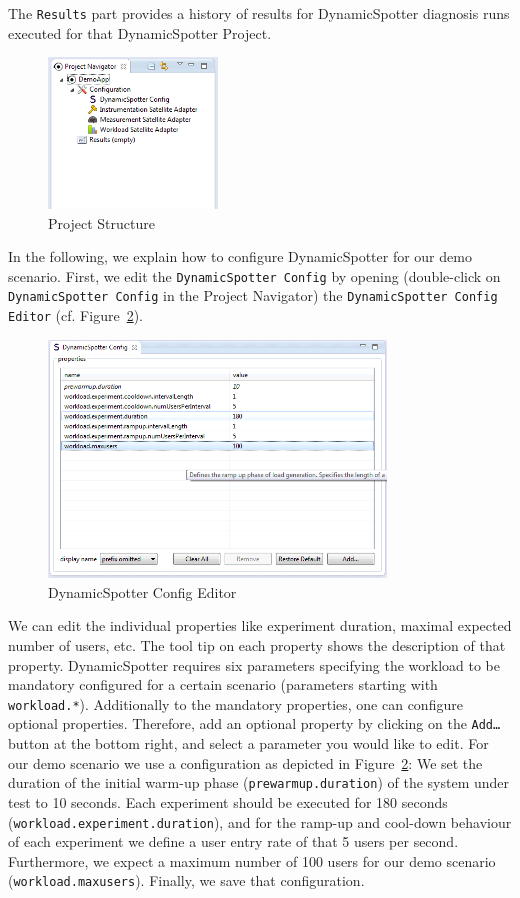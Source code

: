 \documentclass{report}
\newcommand{\DS}{DynamicSpotter }
\begin{document}
The \texttt{Results} part provides a history of results for \DS diagnosis runs
executed for that \DS Project.

\begin{figure}[h]
\centering
\includegraphics[width=0.4\textwidth]{figures/demo/0004-navigation.png}
\caption{Project Structure}
\label{fig:projectStructure}
\end{figure}

In the following, we explain how to configure \DS for our demo scenario. First, we edit the \texttt{\DS Config} by
opening (double-click on \texttt{\DS Config} in the Project Navigator) the \texttt{\DS Config Editor} (cf.
Figure~\ref{fig:confgiEditor}). 
\begin{figure}[h]
\centering
\includegraphics[width=0.8\textwidth]{figures/demo/0005-configEditor.png}
\caption{\DS Config Editor}
\label{fig:confgiEditor}
\end{figure}
We can edit the individual properties like experiment duration, maximal
expected number of users, etc. The tool tip on each property shows the description of that property. 
\DS requires six parameters specifying the workload to be mandatory configured for a certain scenario (parameters
starting with \texttt{workload.*}). Additionally to the mandatory properties, one can configure optional properties. 
Therefore, add an optional property by clicking on the \texttt{Add\ldots} button at the bottom right, and select a
parameter you would like to edit.
For our demo scenario we use a configuration as depicted in Figure~\ref{fig:confgiEditor}: We set the duration of
the initial warm-up phase (\texttt{prewarmup.duration}) of the system under test to 10 seconds. Each experiment should
be executed for 180 seconds (\texttt{workload.experiment.duration}), and for the ramp-up and cool-down behaviour of each
experiment we define a user entry rate of that 5 users per second. Furthermore, we expect a maximum number of 100
users for our demo scenario (\texttt{workload.maxusers}). 
Finally, we save that configuration.
\end{document}
